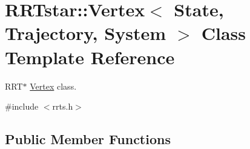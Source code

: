 \hypertarget{class_r_r_tstar_1_1_vertex}{\section{R\-R\-Tstar\-:\-:Vertex$<$ State, Trajectory, System $>$ Class Template Reference}
\label{class_r_r_tstar_1_1_vertex}
}


R\-R\-T$\ast$ \hyperlink{class_r_r_tstar_1_1_vertex}{Vertex} class.  




{\ttfamily \#include $<$rrts.\-h$>$}

\subsection*{Public Member Functions}

